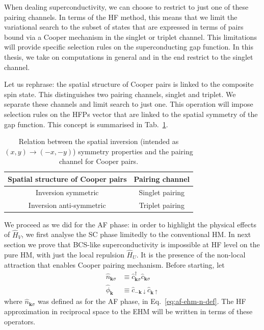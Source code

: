When dealing superconductivity, we can choose to restrict to just one of these pairing channels. In terms of the HF method, this means that we limit the variational search to the subset of states that are expressed in terms of pairs bound via a Cooper mechanism in the singlet or triplet channel. This limitations will provide specific selection rules on the superconducting gap function. In this thesis, we take on computations in general and in the end restrict to the singlet channel.

Let us rephrase: the spatial structure of Cooper pairs is linked to the composite spin state. This distinguishes two pairing channels, singlet and triplet. We separate these channels and limit search to just one. This operation will impose selection rules on the HFPs vector that are linked to the spatial symmetry of the gap function. This concept is summarised in Tab.~\ref{tab:sc-pairings-symmetry-structures}.

\begin{table}
	\centering
	\begin{tabular}{c c}
		\textbf{Spatial structure of Cooper pairs} & \textbf{Pairing channel} \\
		\midrule
		Inversion symmetric & Singlet pairing \\
		Inversion anti-symmetric & Triplet pairing \\
		\midrule
	\end{tabular}
	\caption{Relation between the spatial inversion (intended as $(x,y) \to (-x,-y)$) symmetry properties and the pairing channel for Cooper pairs.}
	\label{tab:sc-pairings-symmetry-structures}
\end{table}

We proceed as we did for the AF phase: in order to highlight the physical effects of $\hat H_V$, we first analyse the SC phase limitedly to the conventional HM. In next section we prove that BCS-like superconductivity is impossible at HF level on the pure HM, with just the local repulsion $\hat H_U$. It is the presence of the non-local attraction that enables Cooper pairing mechanism. Before starting, let
\begin{align}
	\hat n_{\mathbf{k}\sigma} &\equiv \hat c_{\mathbf{k}\sigma}^\dagger \hat c_{\mathbf{k}\sigma} \label{eq:sc-ehm-n-def} \\
	\hat \phi_\mathbf{k} &\equiv \hat c_{-\mathbf{k}\downarrow} \hat c_{\mathbf{k}\uparrow}\label{eq:sc-ehm-phi-def}
\end{align}
where $\hat n_{\mathbf{k}\sigma}$ was defined as for the AF phase, in Eq.~\eqref{eq:af-ehm-n-def}. The HF approximation in reciprocal space to the EHM will be written in terms of these operators.

